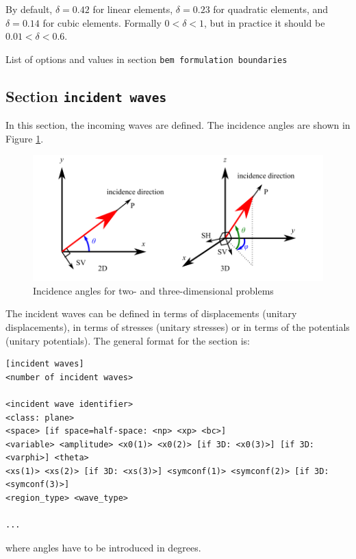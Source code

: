 \documentclass[a4paper,fleqn]{book}
\begin{document}
\begin{table}
{By default, $\delta=0.42$ for linear elements, $\delta=0.23$ for quadratic elements, and $\delta=0.14$ for cubic elements. Formally $0<\delta<1$, but in practice it should be $0.01<\delta<0.6$.

\caption{List of options and values in section \texttt{bem formulation boundaries}}
\label{tab:bem_formulation_boundaries}
}
\end{table}


\subsection{Section \texttt{incident waves}}
In this section, the incoming waves are defined. The incidence angles are shown in Figure \ref{fig:incidence}.

\begin{figure}[h]
\centering
%
\includegraphics{figures/incidence_angle.pdf}
\caption{Incidence angles for two- and three-dimensional problems\label{fig:incidence}}
\end{figure}

The incident waves can be defined in terms of displacements (unitary displacements), in terms of stresses (unitary stresses) or in terms of the potentials (unitary potentials). The general format for the section is:
\begin{Verbatim}[frame=single, fontsize=\small, label={general format of section [incident waves]}]
[incident waves]
<number of incident waves>

<incident wave identifier>
<class: plane>
<space> [if space=half-space: <np> <xp> <bc>]
<variable> <amplitude> <x0(1)> <x0(2)> [if 3D: <x0(3)>] [if 3D: <varphi>] <theta>
<xs(1)> <xs(2)> [if 3D: <xs(3)>] <symconf(1)> <symconf(2)> [if 3D: <symconf(3)>]
<region_type> <wave_type>

...
\end{Verbatim} 
where angles have to be introduced in degrees.
\end{document}
